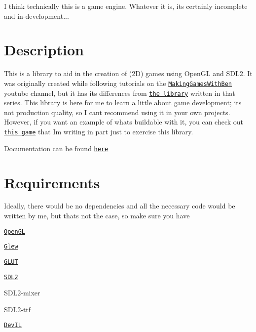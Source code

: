 I think technically this is a game engine. Whatever it is, it\textquotesingle{}s certainly incomplete and in-\/development...

\section*{Description}

This is a library to aid in the creation of (2D) games using Open\+GL and S\+D\+L2. It was originally created while following tutorials on the \href{https://www.youtube.com/channel/UCL5m1_llmeiAdZMo_ZanIvg}{\tt Making\+Games\+With\+Ben} youtube channel, but it has its differences from \href{https://github.com/Barnold1953/GraphicsTutorials}{\tt the library} written in that series. This library is here for me to learn a little about game development; it\textquotesingle{}s not production quality, so I can\textquotesingle{}t recommend using it in your own projects. However, if you want an example of what\textquotesingle{}s buildable with it, you can check out \href{https://github.com/NivenT/Planet}{\tt this game} that I\textquotesingle{}m writing in part just to exercise this library.

Documentation can be found \href{https://nivent.github.io/jubilant-funicular/html/index.html}{\tt here}

\section*{Requirements}

Ideally, there would be no dependencies and all the necessary code would be written by me, but that\textquotesingle{}s not the case, so make sure you have


\begin{DoxyItemize}
\item \href{https://www.opengl.org/}{\tt Open\+GL}
\begin{DoxyItemize}
\item \href{http://glew.sourceforge.net/}{\tt Glew}
\item \href{http://freeglut.sourceforge.net/}{\tt G\+L\+UT}
\end{DoxyItemize}
\item \href{https://www.libsdl.org/download-2.0.php}{\tt S\+D\+L2}
\begin{DoxyItemize}
\item S\+D\+L2-\/mixer
\item S\+D\+L2-\/ttf
\end{DoxyItemize}
\item \href{http://openil.sourceforge.net/}{\tt Dev\+IL}
\end{DoxyItemize}

